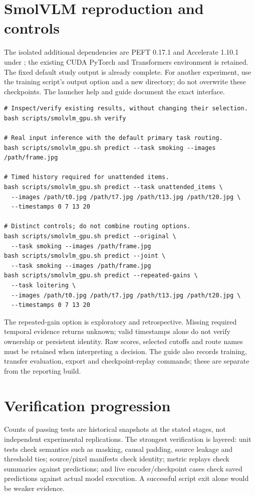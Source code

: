 \section{SmolVLM reproduction and controls}
The isolated additional dependencies are PEFT 0.17.1 and Accelerate 1.10.1 under ; the existing CUDA PyTorch and Transformers environment is retained. The fixed default study output is already complete. For another experiment, use the training script's output option and a new directory; do not overwrite these checkpoints. The launcher help and guide document the exact interface.
\begin{lstlisting}
# Inspect/verify existing results, without changing their selection.
bash scripts/smolvlm_gpu.sh verify

# Real input inference with the default primary task routing.
bash scripts/smolvlm_gpu.sh predict --task smoking --images /path/frame.jpg

# Timed history required for unattended items.
bash scripts/smolvlm_gpu.sh predict --task unattended_items \
  --images /path/t0.jpg /path/t7.jpg /path/t13.jpg /path/t20.jpg \
  --timestamps 0 7 13 20

# Distinct controls; do not combine routing options.
bash scripts/smolvlm_gpu.sh predict --original \
  --task smoking --images /path/frame.jpg
bash scripts/smolvlm_gpu.sh predict --joint \
  --task smoking --images /path/frame.jpg
bash scripts/smolvlm_gpu.sh predict --repeated-gains \
  --task loitering \
  --images /path/t0.jpg /path/t7.jpg /path/t13.jpg /path/t20.jpg \
  --timestamps 0 7 13 20
\end{lstlisting}
The repeated-gain option is exploratory and retrospective. Missing required temporal evidence returns unknown; valid timestamps alone do not verify ownership or persistent identity. Raw scores, selected cutoffs and route names must be retained when interpreting a decision. The guide also records training, transfer evaluation, export and checkpoint-replay commands; these are separate from the reporting build.

\section{Verification progression}

Counts of passing tests are historical snapshots at the stated stages, not independent experimental replications. The strongest verification is layered: unit tests check semantics such as masking, causal padding, source leakage and threshold ties; source/pixel manifests check identity; metric replays check summaries against predictions; and live encoder/checkpoint cases check saved predictions against actual model execution. A successful script exit alone would be weaker evidence.


